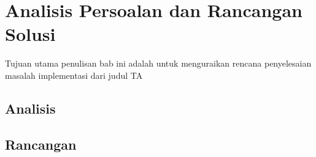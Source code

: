 \chapter{Analisis Persoalan dan Rancangan Solusi}

Tujuan utama penulisan bab ini adalah untuk menguraikan rencana penyelesaian masalah implementasi dari judul TA


\section{Analisis}
\blindtext

\section{Rancangan}
\blindtext